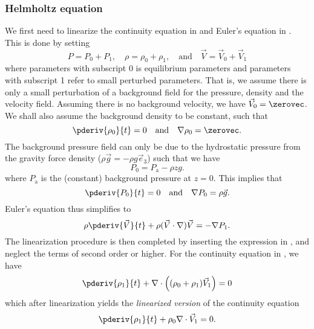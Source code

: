 \subsubsection{Helmholtz equation}
We first need to linearize the continuity equation in  and Euler's equation in . This is done by setting
\begin{equation}\label{Eq2:linearizedExpressions}
	P=P_0+P_1,\quad\rho=\rho_0+\rho_1,\quad\text{and}\quad\vec{V}=\vec{V}_0+\vec{V}_1
\end{equation}
where parameters with subscript 0 is equilibrium parameters and parameters with subscript 1 refer to small perturbed parameters. That is, we assume there is only a small perturbation of a background field for the pressure, density and the velocity field. Assuming there is no background velocity, we have $\vec{V}_0=\zerovec$. We shall also assume the background density to be constant, such that
\begin{equation*}
	\pderiv{\rho_0}{t} = 0\quad\text{and}\quad\nabla\rho_0 = \zerovec.
\end{equation*}
The background pressure field can only be due to the hydrostatic pressure from the gravity force density ($\rho\vec{g} = -\rho g \vec{e}_3$)  such that we have
\begin{equation*}
	P_0 = P_{\mathrm{a}} - \rho z g.
\end{equation*}
where $P_{\mathrm{a}}$ is the (constant) background pressure at $z=0$. This implies that
\begin{equation*}
	\pderiv{P_0}{t} = 0\quad\text{and}\quad \nabla P_0 = \rho\vec{g}.
\end{equation*}
Euler's equation thus simplifies to
\begin{equation}\label{Eq2:simplifiedEulerEquation}
	\rho\pderiv{\vec{V}}{t}+ \rho (\vec{V}\cdot\nabla)\vec{V}= -\nabla P_1.
\end{equation}
The linearization procedure is then completed by inserting the expression in , and neglect the terms of second order or higher. For the continuity equation in , we have
\begin{equation*}
	 \pderiv{\rho_1}{t}+\nabla\cdot\left((\rho_0+\rho_1)\vec{V}_1\right) = 0 
\end{equation*}
which after linearization yields the \textit{linearized version} of the continuity equation
\begin{equation}\label{Eq2:linearizedContinuityEquation}
	 \pderiv{\rho_1}{t}+\rho_0\nabla\cdot\vec{V}_1 = 0.
\end{equation}
